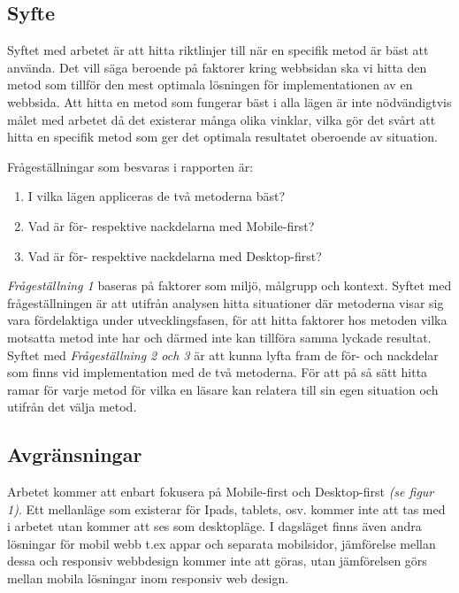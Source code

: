 \documentclass[11pt]{article}
\begin{document}
\subsection{Syfte}
Syftet med arbetet är att hitta riktlinjer till när en specifik metod är bäst att använda. Det vill säga beroende på faktorer kring webbsidan ska vi hitta den metod som tillför den mest optimala lösningen för implementationen av en webbsida. Att hitta en metod som fungerar bäst i alla lägen är inte nödvändigtvis målet med arbetet då det existerar många olika vinklar, vilka gör det svårt att hitta en specifik metod som ger det optimala resultatet oberoende av situation.

\vspace{0.5cm}
Frågeställningar som besvaras i rapporten är:
\begin{enumerate}
	\item I vilka lägen appliceras de två metoderna bäst?
	\item Vad är för- respektive nackdelarna med Mobile-first?
	\item Vad är för- respektive nackdelarna med Desktop-first?
\end{enumerate}
\vspace{0.5cm}
\textit{Frågeställning 1} baseras på faktorer som miljö, målgrupp och kontext. Syftet med frågeställningen är att utifrån analysen hitta situationer där metoderna visar sig vara fördelaktiga under utvecklingsfasen, för att hitta faktorer hos metoden vilka motsatta metod inte har och därmed inte kan tillföra samma lyckade resultat. Syftet med \textit{Frågeställning 2 och 3} är att kunna lyfta fram de för- och nackdelar som finns vid implementation med de två metoderna. För att på så sätt hitta ramar för varje metod för vilka en läsare kan relatera till sin egen situation och utifrån det välja metod.

\subsection{Avgränsningar}

Arbetet kommer att enbart fokusera på Mobile-first och Desktop-first \textit{(se figur 1)}. Ett mellanläge som existerar för Ipads, tablets, osv. kommer inte att tas med i arbetet utan kommer att ses som desktopläge. I dagsläget finns även andra lösningar för mobil webb t.ex appar och separata mobilsidor, jämförelse mellan dessa och responsiv webbdesign kommer inte att göras, utan jämförelsen görs mellan mobila lösningar inom responsiv web design.
\end{document}
